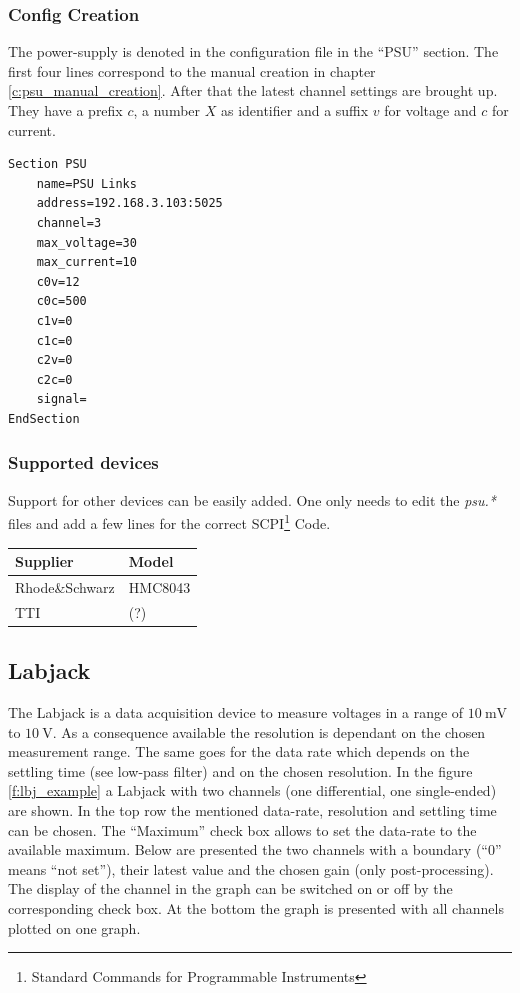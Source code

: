 \documentclass[10pt,a4paper]{article}
\begin{document}
	\subsubsection{Config Creation}
	
	The power-supply is denoted in the configuration file in the \enquote{PSU} section. The first four lines correspond to the manual creation in chapter \ref{c:psu_manual_creation}. After that the latest channel settings are brought up. They have a prefix $c$, a number $X$ as identifier and a suffix $v$ for voltage and $c$ for current.
	
\begin{lstlisting}
Section PSU
	name=PSU Links
	address=192.168.3.103:5025
	channel=3
	max_voltage=30
	max_current=10
	c0v=12
	c0c=500
	c1v=0
	c1c=0
	c2v=0
	c2c=0
	signal=
EndSection
\end{lstlisting}
	
		\subsubsection{Supported devices}
		Support for other devices can be easily added. One only needs to edit the \textit{psu.*} files and add a few lines for the correct SCPI\footnote{Standard Commands for Programmable Instruments} Code.
	
		\begin{table}[H]
		\centering
		\begin{tabular}{ll}
		\toprule
		Supplier			& Model \\ \midrule
		Rhode\&Schwarz		& HMC8043 \\
		TTI					& (?) \\
		\bottomrule
		\end{tabular}			
		\end{table}	
		
\newpage
	
	\subsection{Labjack}
	The Labjack is a data acquisition device to measure voltages in a range of $\SI{10}{\milli\volt}$ to $\SI{10}{\volt}$. As a consequence available the resolution is dependant on the chosen measurement range. The same goes for the data rate which depends on the settling time (see low-pass filter) and on the chosen resolution. In the figure \eqref{f:lbj_example} a Labjack with two channels (one differential, one single-ended) are shown. In the top row the mentioned data-rate, resolution and settling time can be chosen. The \enquote{Maximum} check box allows to set the data-rate to the available maximum. Below are presented the two channels with a boundary (\enquote{0} means \enquote{not set}), their latest value and the chosen gain (only post-processing). The display of the channel in the graph can be switched on or off by the corresponding check box. At the bottom the graph is presented with all channels plotted on one graph.
	
\end{document}

